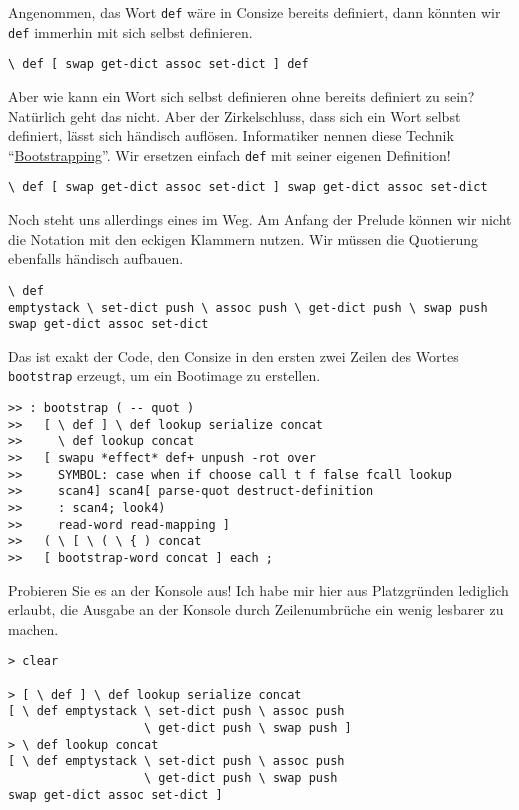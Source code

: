 Angenommen, das Wort \verb|def| wäre in Consize bereits definiert, dann könnten wir \verb|def| immerhin mit sich selbst definieren.

\begin{verbatim}
\ def [ swap get-dict assoc set-dict ] def
\end{verbatim}

Aber wie kann ein Wort sich selbst definieren ohne bereits definiert zu sein? Natürlich geht das nicht. Aber der Zirkelschluss, dass sich ein Wort selbst definiert, lässt sich händisch auflösen. Informatiker nennen diese Technik "`\href{http://de.wikipedia.org/wiki/Bootstrapping\_(Informatik)}{Bootstrapping}"'. Wir ersetzen einfach \verb|def| mit seiner eigenen Definition!

\begin{verbatim}
\ def [ swap get-dict assoc set-dict ] swap get-dict assoc set-dict
\end{verbatim}

Noch steht uns allerdings eines im Weg. Am Anfang der Prelude können wir nicht die Notation mit den eckigen Klammern nutzen. Wir müssen die Quotierung ebenfalls händisch aufbauen.

\begin{verbatim}
\ def
emptystack \ set-dict push \ assoc push \ get-dict push \ swap push
swap get-dict assoc set-dict
\end{verbatim}

Das ist exakt der Code, den Consize in den ersten zwei Zeilen des Wortes \verb|bootstrap| erzeugt, um ein Bootimage zu erstellen.

\begin{verbatim}
>> : bootstrap ( -- quot )
>>   [ \ def ] \ def lookup serialize concat 
>>     \ def lookup concat
>>   [ swapu *effect* def+ unpush -rot over
>>     SYMBOL: case when if choose call t f false fcall lookup
>>     scan4] scan4[ parse-quot destruct-definition
>>     : scan4; look4)
>>     read-word read-mapping ]
>>   ( \ [ \ ( \ { ) concat
>>   [ bootstrap-word concat ] each ;
\end{verbatim}

Probieren Sie es an der Konsole aus! Ich habe mir hier aus Platzgründen lediglich erlaubt, die Ausgabe an der Konsole durch Zeilenumbrüche ein wenig lesbarer zu machen.

\begin{verbatim}
> clear

> [ \ def ] \ def lookup serialize concat
[ \ def emptystack \ set-dict push \ assoc push
                   \ get-dict push \ swap push ]
> \ def lookup concat
[ \ def emptystack \ set-dict push \ assoc push
                   \ get-dict push \ swap push
swap get-dict assoc set-dict ]
\end{verbatim}

